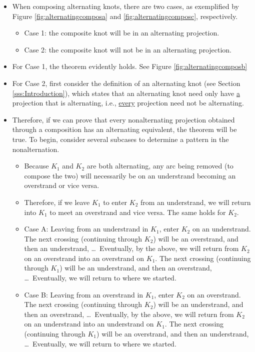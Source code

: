 \documentclass[titlepage]{article}
\numberwithin{figure}{section}
\numberwithin{table}{section}
\numberwithin{equation}{section}
\begin{document}
\begin{itemize}
\begin{figure}[h!]
        \label{fig:alternatingcompos}
    \end{figure}
    \begin{itemize}
        \item When composing alternating knots, there are two cases, as exemplified by Figure \ref{fig:alternatingcomposa} and \ref{fig:alternatingcomposc}, respectively.
        \begin{itemize}
            \item Case 1: the composite knot will be in an alternating projection.
            \item Case 2: the composite knot will not be in an alternating projection.
        \end{itemize}
        \item For Case 1, the theorem evidently holds. See Figure \ref{fig:alternatingcomposb}
        \item For Case 2, first consider the definition of an alternating knot (see Section \ref{sss:Introduction}), which states that an alternating knot need only have \underline{a} projection that is alternating, i.e., \underline{every} projection need not be alternating.
        \item Therefore, if we can prove that every nonalternating projection obtained through a composition has an alternating equivalent, the theorem will be true. To begin, consider several subcases to determine a pattern in the nonalternation.
        \begin{itemize}
            \item Because $K_1$ and $K_2$ are both alternating, any arc being removed (to compose the two) will necessarily be on an understrand becoming an overstrand or vice versa.
            \item Therefore, if we leave $K_1$ to enter $K_2$ from an understrand, we will return into $K_1$ to meet an overstrand and vice versa. The same holds for $K_2$.
            \item Case A: Leaving from an understrand in $K_1$, enter $K_2$ on an understrand. The next crossing (continuing through $K_2$) will be an overstrand, and then an understrand, \dots\ Eventually, by the above, we will return from $K_2$ on an overstrand into an overstrand on $K_1$. The next crossing (continuing through $K_1$) will be an understrand, and then an overstrand, \dots\ Eventually, we will return to where we started.
            \item Case B: Leaving from an overstrand in $K_1$, enter $K_2$ on an overstrand. The next crossing (continuing through $K_2$) will be an understrand, and then an overstrand, \dots\ Eventually, by the above, we will return from $K_2$ on an understrand into an understrand on $K_1$. The next crossing (continuing through $K_1$) will be an overstrand, and then an understrand, \dots\ Eventually, we will return to where we started.

\end{itemize}
\end{itemize}
\end{itemize}
\end{document}
